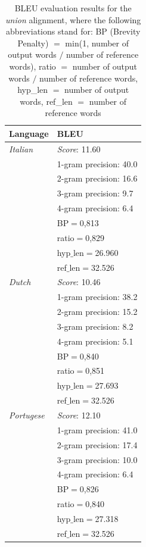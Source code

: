 \documentclass[11pt]{article}
\begin{document}
\begin{itemize}
\begin{center}
    \begin{table}
    \begin{tabular}{ | l | l |}
    \hline
    \textbf{Language} & \textbf{BLEU} \\ 
    \hline
    \textit{Italian} & \textit{Score}: 11.60 \\
    & 1-gram precision: 40.0 \\
    & 2-gram precision: 16.6 \\
    & 3-gram precision: 9.7 \\
    & 4-gram precision: 6.4 \\
    & BP$=$0,813 \\
    & ratio$=$0,829 \\
    & hyp$\_$len$=$26.960 \\
    & ref$\_$len$=$32.526\\
    \hline
    \textit{Dutch} & \textit{Score}: 10.46 \\
    & 1-gram precision: 38.2 \\
    & 2-gram precision: 15.2 \\
    & 3-gram precision: 8.2 \\
    & 4-gram precision: 5.1 \\
    & BP$=$0,840 \\
    & ratio$=$0,851 \\
    & hyp$\_$len$=$27.693 \\
    & ref$\_$len$=$32.526\\
    \hline
    \textit{Portugese} & \textit{Score}: 12.10 \\
    & 1-gram precision: 41.0 \\
    & 2-gram precision: 17.4 \\
    & 3-gram precision: 10.0 \\
    & 4-gram precision: 6.4 \\
    & BP$=$0,826 \\
    & ratio$=$0,840 \\
    & hyp$\_$len$=$27.318 \\
    & ref$\_$len$=$32.526\\
    \hline
    \end{tabular}
    \caption{BLEU evaluation results for the \textit{union} alignment, where the following abbreviations stand for: BP (Brevity Penalty) $=$ min(1, number of output words $/$ number of reference words), ratio $=$ number of output words $/$ number of reference words, hyp\_len $=$ number of output words, ref\_len $=$ number of reference words }
    \label{bleuUnion}
    \end{table}
\end{center}


\end{itemize}
\end{document}

